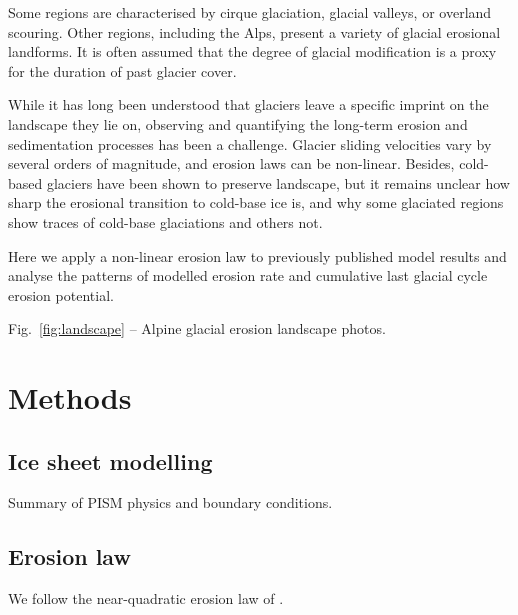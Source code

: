 \documentclass[utf8]{article}
\begin{document}
    Some regions are characterised by cirque glaciation, glacial valleys,
    or overland scouring. Other regions, including the Alps, present a variety
    of glacial erosional landforms. It is often assumed that the degree of
    glacial modification is a proxy for the duration of past glacier cover.

    While it has long been understood that glaciers leave a specific imprint on
    the landscape they lie on, observing and quantifying the long-term erosion
    and sedimentation processes has been a challenge. Glacier sliding
    velocities vary by several orders of magnitude, and erosion laws can be
    non-linear. Besides, cold-based glaciers have been shown to preserve
    landscape, but it remains unclear how sharp the erosional transition to
    cold-base ice is, and why some glaciated regions show traces of cold-base
    glaciations and others not.

    Here we apply a non-linear erosion law to previously published model
    results and analyse the patterns of modelled erosion rate and cumulative
    last glacial cycle erosion potential.

    Fig.~\ref{fig:landscape} -- Alpine glacial erosion landscape photos.

\section{Methods}

\subsection{Ice sheet modelling}

    Summary of PISM physics and boundary conditions.

\subsection{Erosion law}

    We follow the near-quadratic erosion law of \citep{Herman.etal.2015}.
\end{document}
